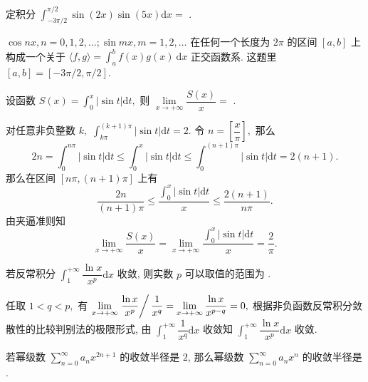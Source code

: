 
\begin{question}
定积分 $\int_{-3\pi/2}^{\pi/2} \sin(2x) \sin(5x) \mathrm{d} x = $ \fillin[0].
\end{question}

\begin{solution}
$\cos nx, n = 0, 1, 2, \dots; \sin m x, m = 1, 2, \dots$ 在任何一个长度为 $2\pi$ 的区间 $[a,b]$ 上构成一个关于 $\langle f, g \rangle = \int_{a}^{b} f(x)g (x) ~ \mathrm{d} x$ 正交函数系. 这题里 $[a, b] = [-3\pi/2, \pi/2].$
\end{solution}

\begin{question}
设函数 $S(x) = \int_0^x \lvert \sin t \rvert \mathrm{d} t,$ 则 $\lim\limits_{x\to+\infty} \dfrac{S(x)}{x} =$ \fillin[$\dfrac{2}{\pi}$].
\end{question}

\begin{solution}
对任意非负整数 $k,$ $\int_{k\pi}^{(k+1)\pi} \lvert \sin t \rvert \mathrm{d} t = 2.$ 令 $n = \left[ \dfrac{x}{\pi} \right],$ 那么
\[2n = \int_0^{n\pi} \lvert \sin t \rvert \mathrm{d} t \leqslant \int_0^x \lvert \sin t \rvert \mathrm{d} t \leqslant \int_0^{(n+1)\pi} \lvert \sin t \rvert \mathrm{d} t = 2(n+1).\]
那么在区间 $[n\pi, (n+1)\pi]$ 上有
\[\dfrac{2n}{(n+1)\pi} \leqslant \dfrac{\int_0^x \lvert \sin t \rvert \mathrm{d} t}{x} \leqslant \dfrac{2(n+1)}{n\pi}.\]
由夹逼准则知
\[\lim\limits_{x\to+\infty} \dfrac{S(x)}{x} = \lim\limits_{x\to+\infty} \dfrac{\int_0^x \lvert \sin t \rvert \mathrm{d} t}{x} = \dfrac{2}{\pi}.\]
\end{solution}

\begin{question}
若反常积分 $\int_1^{+\infty} \dfrac{\ln x}{x^p} \mathrm{d} x$ 收敛, 则实数 $p$ 可以取值的范围为 \fillin[$(1, +\infty)$ (或写 $p > 1$)].
\end{question}

\begin{solution}
任取 $1 < q < p,$ 有 $\lim\limits_{x\to+\infty} \left. \dfrac{\ln x}{x^p} \right/ \dfrac{1}{x^q} = \lim\limits_{x\to+\infty} \dfrac{\ln x}{x^{p-q}} = 0,$ 根据非负函数反常积分敛散性的比较判别法的极限形式, 由 $\int_1^{+\infty} \dfrac{1}{x^q} \mathrm{d} x$ 收敛知 $\int_1^{+\infty} \dfrac{\ln x}{x^p} \mathrm{d} x$ 收敛.
\end{solution}

\begin{question}
若幂级数 $\sum\limits_{n=0}^\infty a_n x^{2n+1}$ 的收敛半径是 $2$, 那么幂级数 $\sum\limits_{n=0}^\infty a_n x^n$ 的收敛半径是 \fillin[$4$].
\end{question}

